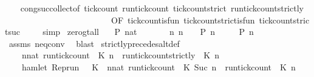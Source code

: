 \begin{isabellebody}
%
\isadelimproof
\ \ %
\endisadelimproof
%
\isatagproof
{}\isamarkupfalse%
\ cong{\isacharunderscore}suc{\isacharunderscore}collect{\isacharbrackleft}of\ tick{\isacharunderscore}count\ run{\isacharunderscore}tick{\isacharunderscore}count\ tick{\isacharunderscore}count{\isacharunderscore}strict\ run{\isacharunderscore}tick{\isacharunderscore}count{\isacharunderscore}strictly{\isacharcomma}\isanewline
\ \ \ \ \ \ \ \ \ \ \ \ \ \ \ \ \ \ \ \ \ \ \ \ \ OF\ tick{\isacharunderscore}count{\isacharunderscore}is{\isacharunderscore}fun\ tick{\isacharunderscore}count{\isacharunderscore}strict{\isacharunderscore}is{\isacharunderscore}fun\ tick{\isacharunderscore}count{\isacharunderscore}strict{\isacharunderscore}suc{\isacharbrackright}\ \isanewline
\ \ \isamarkupfalse%
\ simp%
\endisatagproof
{\isafoldproof}%
%
\isadelimproof
\isanewline
%
\endisadelimproof
\isanewline
{}\isamarkupfalse%
\ zero{\isacharunderscore}gt{\isacharunderscore}all{\isacharcolon}\isanewline
\ \ \ {\isacartoucheopen}P\ {\isacharparenleft}{}{\isacharcolon}{\isacharcolon}nat{\isacharparenright}{\isacartoucheclose}\isanewline
\ \ \ \ \ \ \ {\isacartoucheopen}{\isasymAnd}n{\isachardot}\ n\ {\isachargreater}\ {}\ {\isasymLongrightarrow}\ P\ n{\isacartoucheclose}\isanewline
\ \ \ \ \ {\isacartoucheopen}P\ n{\isacartoucheclose}\isanewline
%
\isadelimproof
\ \ %
\endisadelimproof
%
\isatagproof
{}\isamarkupfalse%
\ assms\ neq{}{\isacharunderscore}conv\ \isamarkupfalse%
\ blast%
\endisatagproof
{\isafoldproof}%
%
\isadelimproof
\isanewline
%
\endisadelimproof
\isanewline
{}\isamarkupfalse%
\ strictly{\isacharunderscore}precedes{\isacharunderscore}alt{\isacharunderscore}def{}{\isacharcolon}\isanewline
\ \ {\isacartoucheopen}{\isacharbraceleft}\ {\isasymrho}{\isachardot}\ {\isasymforall}n{\isacharcolon}{\isacharcolon}nat{\isachardot}\ {\isacharparenleft}run{\isacharunderscore}tick{\isacharunderscore}count\ {\isasymrho}\ K\ n{\isacharparenright}\ {\isasymle}\ {\isacharparenleft}run{\isacharunderscore}tick{\isacharunderscore}count{\isacharunderscore}strictly\ {\isasymrho}\ K\ n{\isacharparenright}\ {\isacharbraceright}\isanewline
\ {\isacharequal}\ {\isacharbraceleft}\ {\isasymrho}{\isachardot}\ {\isacharparenleft}{\isasymnot}hamlet\ {\isacharparenleft}{\isacharparenleft}Rep{\isacharunderscore}run\ {\isasymrho}{\isacharparenright}\ {}\ K\ {\isasymand}\ {\isacharparenleft}{\isasymforall}n{\isacharcolon}{\isacharcolon}nat{\isachardot}\ {\isacharparenleft}run{\isacharunderscore}tick{\isacharunderscore}count\ {\isasymrho}\ K\ {\isacharparenleft}Suc\ n{\isacharparenright}{\isacharparenright}\ {\isasymle}\ {\isacharparenleft}run{\isacharunderscore}tick{\isacharunderscore}count\ {\isasymrho}\ K\ n{\isacharparenright}{\isacharparenright}\ {\isacharbraceright}{\isacartoucheclose}\isanewline

\end{isabellebody}
